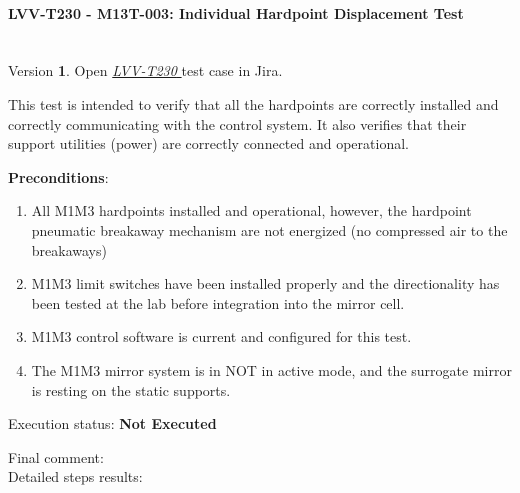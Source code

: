 \documentclass[SE,lsstdraft,STR,toc]{lsstdoc}
\providecommand{\tightlist}{
  \setlength{\itemsep}{0pt}\setlength{\parskip}{0pt}}
\begin{document}
\paragraph{ LVV-T230 - M13T-003: Individual Hardpoint Displacement Test }\mbox{}\\

Version \textbf{1}.
Open  \href{https://jira.lsstcorp.org/secure/Tests.jspa#/testCase/LVV-T230}{\textit{ LVV-T230 } }
test case in Jira.

This test is intended to verify that all the hardpoints are correctly
installed and correctly communicating with the control system. It also
verifies that their support utilities (power) are correctly connected
and operational.

\textbf{ Preconditions}:\\
\begin{enumerate}
\tightlist
\item
  All M1M3 hardpoints installed and operational, however, the hardpoint
  pneumatic breakaway mechanism are not energized (no compressed air to
  the breakaways)
\item
  M1M3 limit switches have been installed properly and the
  directionality has been tested at the lab before integration into the
  mirror cell.
\item
  M1M3 control software is current and configured for this test.
\item
  The M1M3 mirror system is in NOT in active mode, and the surrogate
  mirror is resting on the static supports.
\end{enumerate}

Execution status: {\bf Not Executed }

Final comment:\\


Detailed steps results:
\end{document}
